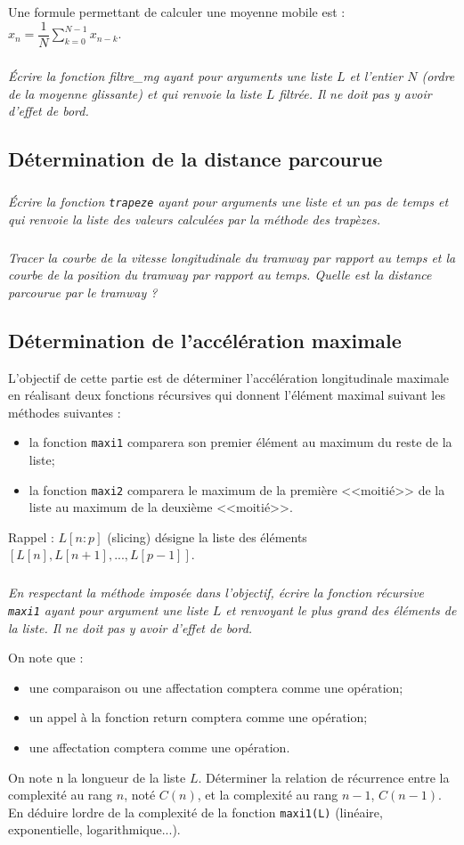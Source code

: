 \documentclass[10pt,fleqn]{article} %
\begin{document}
\begin{multicols}{2}
Une formule permettant de calculer une moyenne mobile est :
$x_n=\dfrac{1}{N} \sum \limits_{k=0}^{N-1}x_{n-k} $.

\subparagraph{}
\textit{Écrire la fonction filtre\_mg ayant pour arguments une liste $L$ et l'entier $N$ (ordre de la moyenne glissante) et qui renvoie la liste $L$ filtrée. Il ne doit pas y avoir d'effet de bord.}

\subsection*{Détermination de la distance parcourue}

\subparagraph{}
\textit{Écrire la fonction \texttt{trapeze} ayant pour arguments une liste et un pas de temps et qui renvoie la liste des valeurs calculées par la méthode des trapèzes.}

\subparagraph{}
\textit{Tracer la courbe de la vitesse longitudinale du tramway par rapport au temps et la courbe de la position du tramway par rapport au temps. Quelle est la distance parcourue par le tramway ?}

\subsection*{Détermination de l'accélération maximale}

L'objectif de cette partie est de déterminer l'accélération longitudinale maximale en réalisant deux fonctions récursives qui donnent l’élément maximal suivant les méthodes suivantes :
\begin{itemize}
\item la fonction \texttt{maxi1} comparera son premier élément au maximum du reste de la liste;
\item la fonction \texttt{maxi2} comparera le maximum de la première <<moitié>> de la liste au maximum de la deuxième <<moitié>>.
\end{itemize}
\begin{rappel}
Rappel : $L[n:p]$ (slicing) désigne la liste des éléments $[L[n],L[n+1],...,L[p-1]]$.
\end{rappel}
\subparagraph{}
\textit{En respectant la méthode imposée dans l'objectif, écrire la fonction récursive \texttt{maxi1} ayant pour argument une liste $L$ et renvoyant le plus grand des éléments de la liste. Il ne doit pas y avoir d'effet de bord.}

On note que : 
\begin{itemize}
\item une comparaison ou une affectation comptera comme une opération;
\item un appel à la fonction return comptera comme une opération;
\item une affectation comptera comme une opération.
\end{itemize}
On note n la longueur de la liste $L$. Déterminer la relation de récurrence entre la complexité au rang $n$, noté $C(n)$, et la complexité au rang $n-1$, $C(n-1)$. En déduire lordre de la complexité de la fonction \texttt{maxi1(L)} (linéaire, exponentielle, logarithmique...).


\end{multicols}
\end{document}
